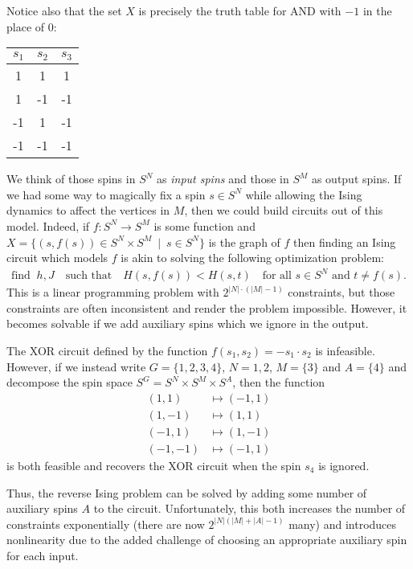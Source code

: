 \begin{homework}[e]
  Notice also that the set $X$ is precisely the truth table for AND with $-1$ in the place of $0$:
  \begin{center}  
    \begin{tabular}{|c | c || c|}
      $s_1$ & $s_2$ & $s_3$ \\
      \hline
      1 & 1 & 1 \\
      1 & -1 & -1 \\
      -1 & 1 & -1 \\
      -1 & -1 & -1
    \end{tabular}
  \end{center}
  We think of those spins in $S^N$ as \emph{input spins} and those in $S^M$ as output spins. If we had some way to magically fix a spin $s \in S^N$ while allowing the Ising dynamics to affect the vertices in $M$, then we could build circuits out of this model. Indeed, if $f:S^N\to S^M$ is some function and $X = \{(s,f(s)) \in S^N\times S^M ~\mid~ s\in S^N\}$ is the graph of $f$ then finding an Ising circuit which models $f$ is akin to solving the following optimization problem: 
  \begin{align*}
    \text{find } ~h, J \text{ ~ such that ~ } H(s,f(s)) < H(s,t) \text{ ~ for all $s \in S^N$ and $t \neq f(s)$.}
  \end{align*}
  This is a linear programming problem with $2^{|N|\cdot(|M|-1)}$ constraints, but those constraints are often inconsistent and render the problem impossible. However, it becomes solvable if we add auxiliary spins which we ignore in the output.
  \begin{example}
    The XOR circuit defined by the function $f(s_1,s_2) = -s_1\cdot s_2$ is infeasible. However, if we instead write $G = \{1,2,3,4\}$, $N = {1,2}$, $M = \{3\}$ and $A = \{4\}$ and decompose the spin space $S^G = S^N\times S^M \times S^A$, then the function
    \begin{align*}
      (1,1) &\mapsto (-1,1) \\
      (1,-1) &\mapsto (1,1) \\
      (-1,1) &\mapsto (1,-1) \\
      (-1,-1) &\mapsto (-1,1)
    \end{align*}
    is both feasible and recovers the XOR circuit when the spin $s_4$ is ignored.
  \end{example}
  Thus, the reverse Ising problem can be solved by adding some number of auxiliary spins $A$ to the circuit. Unfortunately, this both increases the number of constraints exponentially (there are now $2^{|N|(|M|+|A| - 1)}$ many) and introduces nonlinearity due to the added challenge of choosing an appropriate auxiliary spin for each input.


\end{homework}
